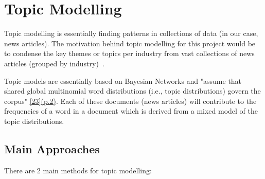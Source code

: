 \section{Topic Modelling}

Topic modelling is essentially finding patterns in collections of data (in our case, news articles). The motivation behind topic modelling for this project would be to condense the key themes or topics per industry from vast collections of news articles (grouped by industry)~\cite{24_rinaldi2021semantic}.

Topic models are essentially based on Bayesian Networks and "assume that shared global multinomial word distributions (i.e., topic distributions) govern the corpus" \hyperlink{23}{[23](p.2)}.  Each of these documents (news articles) will contribute to the frequencies of a word in a document which is derived from a mixed model of the topic distributions.

\subsection{Main Approaches} \label{Topic Modelling appoaches}

There are 2 main methods for topic modelling: 

